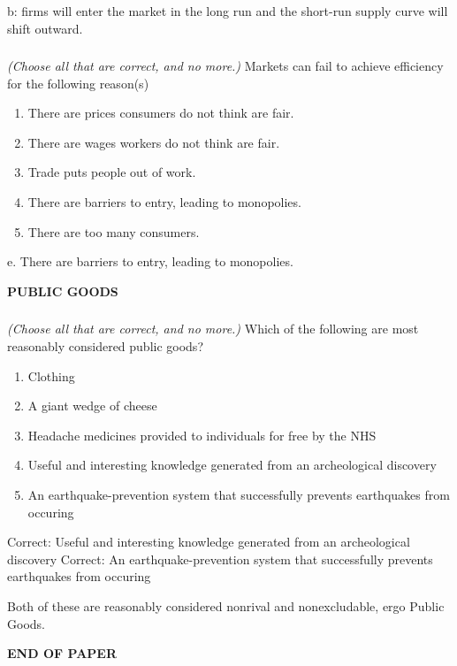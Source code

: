 \documentclass[]{article}
\begin{document}
b: firms will enter the market in the long run and the short-run supply
curve will shift outward.

\hypertarget{section-19}{%
\subsubsection{}\label{section-19}}

\emph{(Choose all that are correct, and no more.)} Markets can fail to
achieve efficiency for the following reason(s)

\begin{enumerate}
\def\labelenumi{\Alph{enumi}.}
\item
  There are prices consumers do not think are fair.
\item
  There are wages workers do not think are fair.
\item
  Trade puts people out of work.
\item
  There are barriers to entry, leading to monopolies.
\item
  There are too many consumers.
\end{enumerate}

e. There are barriers to entry, leading to monopolies.

\textbf{PUBLIC GOODS}

\hypertarget{section-20}{%
\subsubsection{}\label{section-20}}

\emph{(Choose all that are correct, and no more.)} Which of the
following are most reasonably considered public goods?

\begin{enumerate}
\def\labelenumi{\Alph{enumi}.}
\item
  Clothing
\item
  A giant wedge of cheese
\item
  Headache medicines provided to individuals for free by the NHS
\item
  Useful and interesting knowledge generated from an archeological
  discovery
\item
  An earthquake-prevention system that successfully prevents earthquakes
  from occuring
\end{enumerate}

Correct: Useful and interesting knowledge generated from an
archeological discovery Correct: An earthquake-prevention system that
successfully prevents earthquakes from occuring

Both of these are reasonably considered nonrival and nonexcludable, ergo
Public Goods.

\textbf{END OF PAPER}
\end{document}
